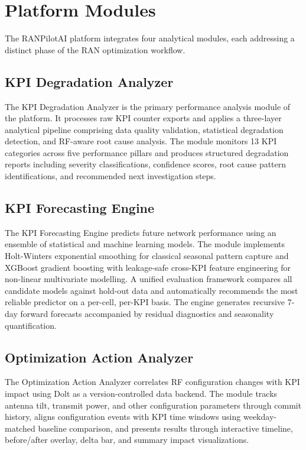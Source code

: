 \section{Platform Modules}

The RANPilotAI platform integrates four analytical modules, each addressing a distinct phase of the RAN optimization workflow.

\subsection{KPI Degradation Analyzer}

The KPI Degradation Analyzer is the primary performance analysis module of the platform. It processes raw KPI counter exports and applies a three-layer analytical pipeline comprising data quality validation, statistical degradation detection, and RF-aware root cause analysis. The module monitors 13 KPI categories across five performance pillars and produces structured degradation reports including severity classifications, confidence scores, root cause pattern identifications, and recommended next investigation steps.

\subsection{KPI Forecasting Engine}

The KPI Forecasting Engine predicts future network performance using an ensemble of statistical and machine learning models. The module implements Holt-Winters exponential smoothing for classical seasonal pattern capture and XGBoost gradient boosting with leakage-safe cross-KPI feature engineering for non-linear multivariate modelling. A unified evaluation framework compares all candidate models against hold-out data and automatically recommends the most reliable predictor on a per-cell, per-KPI basis. The engine generates recursive 7-day forward forecasts accompanied by residual diagnostics and seasonality quantification.

\subsection{Optimization Action Analyzer}

The Optimization Action Analyzer correlates RF configuration changes with KPI impact using Dolt as a version-controlled data backend. The module tracks antenna tilt, transmit power, and other configuration parameters through commit history, aligns configuration events with KPI time windows using weekday-matched baseline comparison, and presents results through interactive timeline, before/after overlay, delta bar, and summary impact visualizations.

